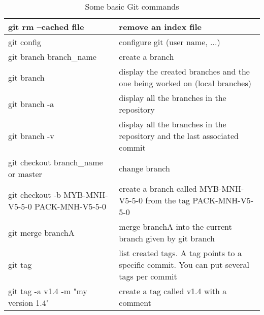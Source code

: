 \begin{table}[H]
\begin{tabular}{l|p{7cm}}
\hline
git rm --cached file & remove an index file \\
\hline
git config & configure git (user name, ...) \\
\hline
git branch branch\_name & create a branch \\
\hline
git branch & display the created branches and the one being worked on (local branches) \\
\hline
git branch -a & display all the branches in the repository \\
\hline
git branch -v & display all the branches in the repository and the last associated commit \\
\hline
git checkout branch\_name or master & change branch \\
\hline
git checkout -b MYB-MNH-V5-5-0 PACK-MNH-V5-5-0 & create a branch called MYB-MNH-V5-5-0 from the tag PACK-MNH-V5-5-0 \\
\hline
git merge branchA &  merge branchA into the current branch given by git branch \\
\hline
git tag & list created tags. A tag points to a specific commit. You can put several tags per commit \\
\hline
git tag -a v1.4 -m "my version 1.4" & create a tag called v1.4 with a comment \\
\hline
\end{tabular}
\caption{Some basic Git commands}
\label{tab:git_commands}
\end{table}